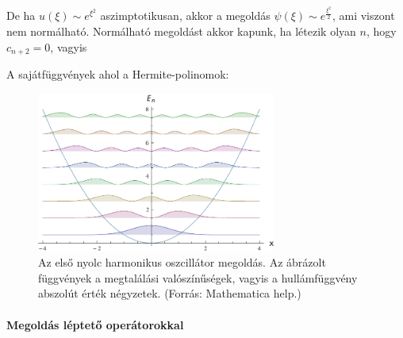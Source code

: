     De ha $u(\xi)\sim e^{\xi^2}$ aszimptotikusan, akkor a megoldás $\psi(\xi)\sim e^{\frac{\xi^2}{2}}$, ami viszont nem normálható. Normálható megoldást akkor kapunk, ha létezik olyan $n$, hogy $c_{n+2}=0$, vagyis
    
    A sajátfüggvények 
    ahol a Hermite-polinomok:
    \begin{figure}[ht!]
     \centering
     \includegraphics[width=0.7\textwidth]{A16tetel/hrmmegoldas}
     \caption{Az első nyolc harmonikus oszcillátor megoldás. Az ábrázolt függvények a megtalálási valószínűségek, vagyis a hullámfüggvény abszolút érték négyzetek. (Forrás: Mathematica help.)}
    \end{figure}
    
   \paragraph{Megoldás léptető operátorokkal}
    
